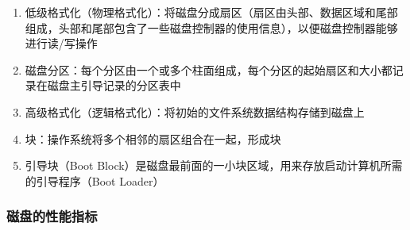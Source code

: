 \documentclass[./computer-organization-and-architecture.tex]{subfiles}
\begin{document}
    \begin{enumerate}
        \item 低级格式化（物理格式化）：将磁盘分成扇区（扇区由头部、数据区域和尾部组成，头部和尾部包含了一些磁盘控制器的使用信息），以便磁盘控制器能够进行读/写操作
        \item 磁盘分区：每个分区由一个或多个柱面组成，每个分区的起始扇区和大小都记录在磁盘主引导记录的分区表中
        \item 高级格式化（逻辑格式化）：将初始的文件系统数据结构存储到磁盘上
        \item 块：操作系统将多个相邻的扇区组合在一起，形成块
        \item 引导块（Boot Block）是磁盘最前面的一小块区域，用来存放启动计算机所需的引导程序（Boot Loader）
    \end{enumerate}

    \subsubsection{磁盘的性能指标}
\end{document}
